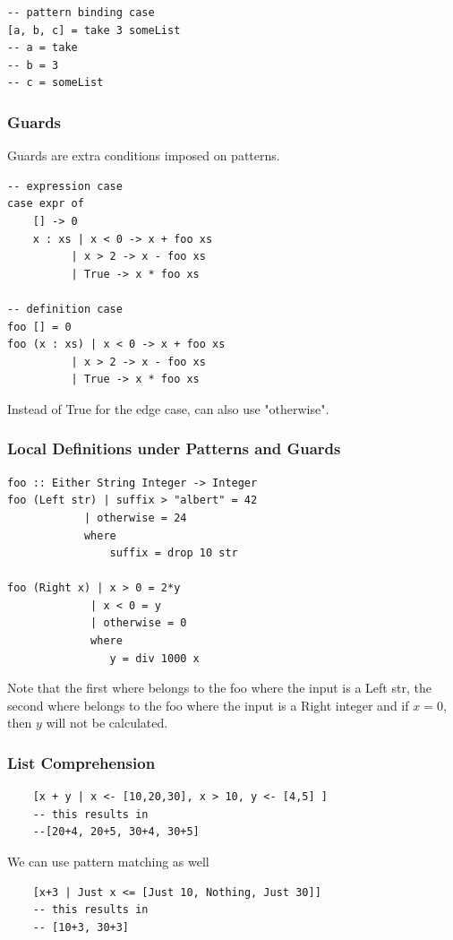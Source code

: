 \documentclass[12pt]{article}
\begin{document}
\begin{lstlisting}
-- pattern binding case
[a, b, c] = take 3 someList
-- a = take
-- b = 3
-- c = someList
\end{lstlisting}

\subsubsection{Guards}

Guards are extra conditions imposed on patterns.

\begin{lstlisting}
-- expression case
case expr of
	[] -> 0
	x : xs | x < 0 -> x + foo xs
		  | x > 2 -> x - foo xs
		  | True -> x * foo xs

-- definition case
foo [] = 0
foo (x : xs) | x < 0 -> x + foo xs
		  | x > 2 -> x - foo xs
		  | True -> x * foo xs
\end{lstlisting}

Instead of True for the edge case, can also use "otherwise".

\subsubsection{Local Definitions under Patterns and Guards}

\begin{lstlisting}
foo :: Either String Integer -> Integer
foo (Left str) | suffix > "albert" = 42
		    | otherwise = 24
		    where
		    	suffix = drop 10 str

foo (Right x) | x > 0 = 2*y
		     | x < 0 = y
		     | otherwise = 0
		     where
		     	y = div 1000 x
\end{lstlisting}
Note that the first where belongs to the foo where the input is a Left str, the second where belongs to the foo where the input is a Right integer and if $x=0$, then $y$ will not be calculated.

\subsubsection{List Comprehension}

\begin{lstlisting}
	[x + y | x <- [10,20,30], x > 10, y <- [4,5] ]
	-- this results in
	--[20+4, 20+5, 30+4, 30+5]
\end{lstlisting}

We can use pattern matching as well

\begin{lstlisting}
	[x+3 | Just x <= [Just 10, Nothing, Just 30]]
	-- this results in
	-- [10+3, 30+3]
\end{lstlisting}
\end{document}
